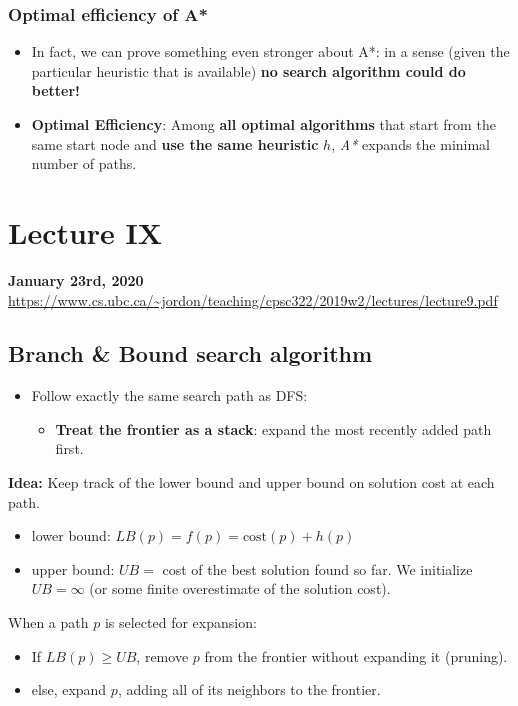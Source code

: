 \documentclass{article}
\theoremstyle{definition}
\begin{document}
\subsubsection*{Optimal efficiency of A*}
\begin{itemize}
	\item In fact, we can prove something even stronger about A*: in a sense (given the particular heuristic that is available) \textbf{\color{red} no search algorithm could do better!}
	\item \textbf{\color{blue} Optimal Efficiency}: Among \textbf{all optimal
		algorithms} that start from the same start node
		and \textbf{use the same heuristic} $ h $, \textsl{A*} {\color{blue} expands the
		minimal number of paths}.
\end{itemize}

\newpage

\section*{Lecture IX}
\textbf{January 23rd, 2020} \\
\url{https://www.cs.ubc.ca/~jordon/teaching/cpsc322/2019w2/lectures/lecture9.pdf}

\subsection*{Branch \& Bound search algorithm}
\begin{itemize}
	\item Follow exactly the same search path as DFS:
	\begin{itemize}
		\item \textbf{Treat the frontier as a stack}: expand the most recently added path first.
	\end{itemize}
\end{itemize}
\textbf{Idea:} Keep track of the {\color{blue} lower bound} and {\color{blue} upper bound} on solution cost at each path. 
\begin{itemize}
	\item {\color{blue} lower bound}: $ LB(p) = f(p) = \text{cost}(p) + h(p) $
	\item {\color{blue} upper bound}: $ UB =$ cost of the best solution found so far. We initialize $ UB = \infty $ (or some finite overestimate of the solution cost).
\end{itemize}
When a path $ p $ is selected for expansion:
\begin{itemize}
	\item If $ LB(p) \geq UB $, remove $ p $ from the frontier without expanding it (pruning).
	\item else, expand $ p $, adding all of its neighbors to the frontier.  
\end{itemize}
\end{document}
